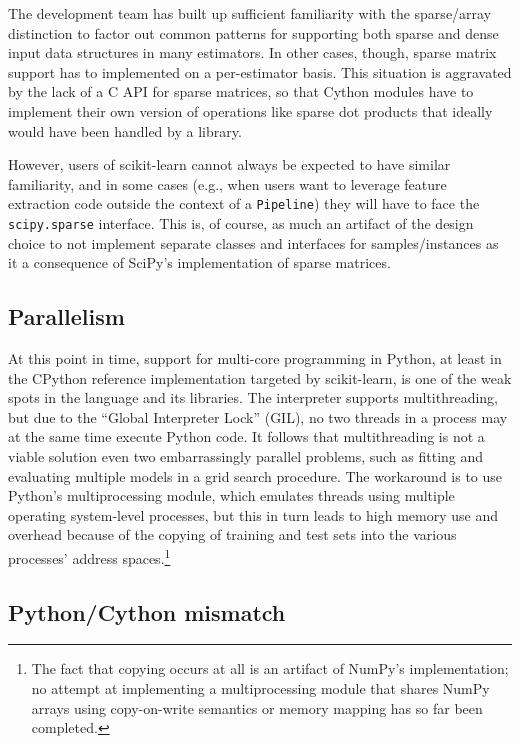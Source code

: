 \documentclass[a4paper,twocolumn]{article}
\begin{document}
The development team has built up sufficient familiarity
with the sparse/array distinction to factor out common patterns
for supporting both sparse and dense input data structures in many estimators.
In other cases, though, sparse matrix support has to implemented
on a per-estimator basis.
This situation is aggravated by the lack of a C API for sparse matrices,
so that Cython modules have to implement their own version
of operations like sparse dot products
that ideally would have been handled by a library.

However, users of scikit-learn cannot always be expected
to have similar familiarity, and in some cases
(e.g., when users want to leverage feature extraction code
outside the context of a \texttt{Pipeline})
they will have to face the \texttt{scipy.sparse} interface.
This is, of course, as much an artifact of the design choice
to not implement separate classes and interfaces for samples/instances
as it a consequence of SciPy's implementation of sparse matrices.

\subsection{Parallelism}

At this point in time, support for multi-core programming in Python,
at least in the CPython reference implementation targeted by scikit-learn,
is one of the weak spots in the language and its libraries.
The interpreter supports multithreading,
but due to the ``Global Interpreter Lock'' (GIL),
no two threads in a process may at the same time execute Python code.
It follows that multithreading is not a viable solution
even two embarrassingly parallel problems,
such as fitting and evaluating multiple models in a grid search procedure.
The workaround is to use Python's multiprocessing module,
which emulates threads using multiple operating system-level processes,
but this in turn leads to high memory use and overhead
because of the copying of training and test sets
into the various processes' address spaces.\footnote{
  The fact that copying occurs at all is an artifact of NumPy's implementation;
  no attempt at implementing a multiprocessing module
  that shares NumPy arrays using copy-on-write semantics or memory mapping
  has so far been completed.}

\subsection{Python/Cython mismatch}
\end{document}
